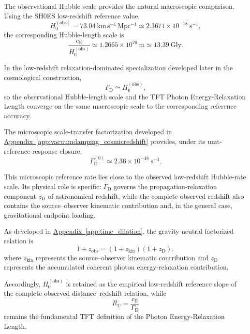 The observational Hubble scale provides the natural macroscopic comparison. Using the SH0ES low-redshift reference value,
\begin{equation}
    H_0^{(\mathrm{obs})}
    =
    73.04\ \mathrm{km\,s^{-1}\,Mpc^{-1}}
    \simeq
    2.3671\times10^{-18}\ \mathrm{s^{-1}},
\end{equation}
the corresponding Hubble-length scale is
\begin{equation}
    \frac{c_{\mathrm E}}
    {H_0^{(\mathrm{obs})}}
    \simeq
    1.2665\times10^{26}\ \mathrm{m}
    \simeq
    13.39\ \mathrm{Gly}.
\end{equation}

In the low-redshift relaxation-dominated specialization developed later in the cosmological construction,
\begin{equation}
    \Gamma_{\mathrm D}
    \simeq
    H_0^{(\mathrm{obs})},
\end{equation}
so the observational Hubble-length scale and the TFT Photon Energy-Relaxation Length converge on the same macroscopic scale to the corresponding reference accuracy.

The microscopic scale-transfer factorization developed in
\hyperref[app:vacuumdamping_cosmicredshift]{Appendix~\ref*{app:vacuumdamping_cosmicredshift}}
provides, under its unit-reference response closure,
\begin{equation}
    \Gamma_{\mathrm D}^{(0)}
    \simeq
    2.36\times10^{-18}\ \mathrm{s^{-1}}.
\end{equation}

This microscopic reference rate lies close to the observed low-redshift Hubble-rate scale. Its physical role is specific: $\Gamma_{\mathrm D}$ governs the propagation-relaxation component $z_{\mathrm D}$ of astronomical redshift, while the complete observed redshift also contains the source--observer kinematic contribution and, in the general case, gravitational endpoint loading.

As developed in
\hyperref[app:time_dilation]{Appendix~\ref*{app:time_dilation}},
the gravity-neutral factorized relation is
\begin{equation}
    1+z_{\mathrm{obs}}
    =
    (1+z_{\mathrm{kin}})
    (1+z_{\mathrm D}),
\end{equation}
where $z_{\mathrm{kin}}$ represents the source--observer kinematic contribution and $z_{\mathrm D}$ represents the accumulated coherent photon energy-relaxation contribution.

Accordingly, $H_0^{(\mathrm{obs})}$ is retained as the empirical low-redshift reference slope of the complete observed distance--redshift relation, while
\begin{equation}
    R_{\mathrm U}
    =
    \frac{c_{\mathrm E}}{\Gamma_{\mathrm D}}
\end{equation}
remains the fundamental TFT definition of the Photon Energy-Relaxation Length.

